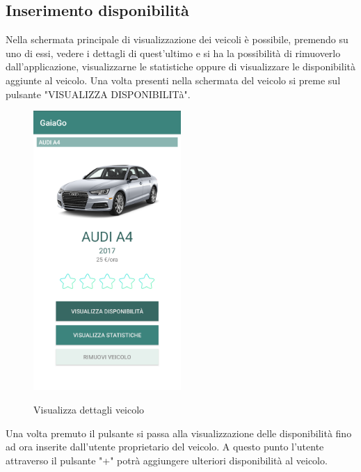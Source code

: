 \subsection{Inserimento disponibilità}
Nella schermata principale di visualizzazione dei veicoli è possibile, premendo su uno di essi, vedere i dettagli di quest'ultimo e si ha la possibilità di rimuoverlo dall'applicazione, visualizzarne le statistiche oppure di visualizzare le disponibilità aggiunte al veicolo. Una volta presenti nella schermata del veicolo si preme sul pulsante "VISUALIZZA DISPONIBILITà".
\begin{figure}[H] 
	\centering 
	\includegraphics[width=0.5\textwidth]{res/images/visualizza_dettagli.png}\\
	\caption{Visualizza dettagli veicolo}
	\label{disponibilità}
\end{figure}
\pagebreak
Una volta premuto il pulsante si passa alla visualizzazione delle disponibilità fino ad ora inserite dall'utente proprietario del veicolo. A questo punto l'utente attraverso il pulsante "+" potrà aggiungere ulteriori disponibilità al veicolo.
